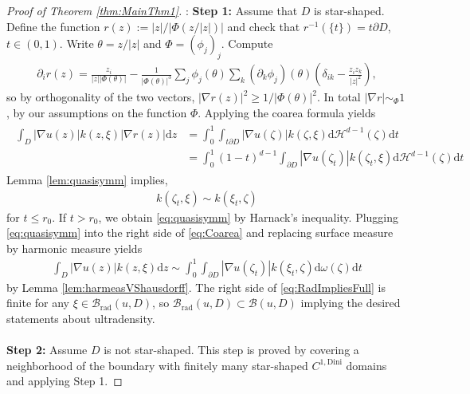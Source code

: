 \documentclass[10pt,a4paper]{amsart}
\begin{document}
	\begin{proof}[Proof of Theorem \ref{thm:MainThm1}]:\newline
		\textbf{Step 1:} Assume that $D$ is star-shaped. Define the function $r(z):=|z|/|\Phi(z/|z|)|$ and check that $r^{-1}(\lbrace t\rbrace)=t\partial D$, $t\in(0,1)$. Write $\theta=z/|z|$ and $\Phi=(\phi_j)_j$. Compute 
		\begin{align*}
			\partial_i r(z) = \frac{z_i}{|z||\Phi(\theta)|}-\frac{1}{|\Phi(\theta)|^3}\sum_j\phi_j(\theta)\sum_k(\partial_k\phi_j)(\theta)\left(\delta_{ik}-\frac{z_iz_k}{|z|^2}\right),
		\end{align*}
		so by orthogonality of the two vectors, $|\nabla r(z)|^2\geq1/|\Phi(\theta)|^2$. In total $|\nabla r|\sim_\Phi 1$, by our assumptions on the function $\Phi$.
		Applying the coarea formula yields
		\begin{align}\label{eq:Coarea}
			\begin{aligned}
				\int_{D}|\nabla u(z)|k(z,\xi)|\nabla r(z)|\mathrm{d}z&=\int_0^1\int_{t\partial D} |\nabla u(\zeta)|k(\zeta,\xi)\mathrm{d}\mathcal{H}^{d-1}(\zeta)\mathrm dt\\
				&=\int_0^{1}(1-t)^{d-1}\int_{\partial D}|\nabla u(\zeta_t)|k(\zeta_t,\xi)\mathrm{d}\mathcal{H}^{d-1}(\zeta)\mathrm{d}t
			\end{aligned}
		\end{align}
		Lemma \ref{lem:quasisymm} implies,
		\begin{align}\label{eq:quasisymm}
			k(\zeta_t,\xi)\sim k(\xi_t,\zeta)
		\end{align}
		for $t\leq r_0$. If $t>r_0$, we obtain \eqref{eq:quasisymm} by Harnack's inequality. Plugging \eqref{eq:quasisymm} into the right side of \eqref{eq:Coarea} and replacing surface measure by harmonic measure yields
		\begin{align}\label{eq:RadImpliesFull}
				\int_{D}|\nabla u(z)|k(z,\xi)\mathrm{d}z\sim \int_0^{1}\int_{\partial D}|\nabla u(\zeta_t)|k(\xi_t,\zeta)\mathrm{d}\omega(\zeta)\mathrm{d}t
		\end{align}
		by Lemma \ref{lem:harmeasVShausdorff}. The right side of \eqref{eq:RadImpliesFull} is finite for any $\xi\in\mathcal B_{\mathrm{rad}}(u,D)$, so $\mathcal B_{\mathrm{rad}}(u,D)\subset \mathcal B(u, D)$ implying the desired statements about ultradensity.\\\\
		\textbf{Step 2:} Assume $D$ is not star-shaped. This step is proved by covering a neighborhood of the boundary with finitely many star-shaped $C^{1,\mathrm{Dini}}$ domains and applying Step 1. \par 

\end{proof}
\end{document}
